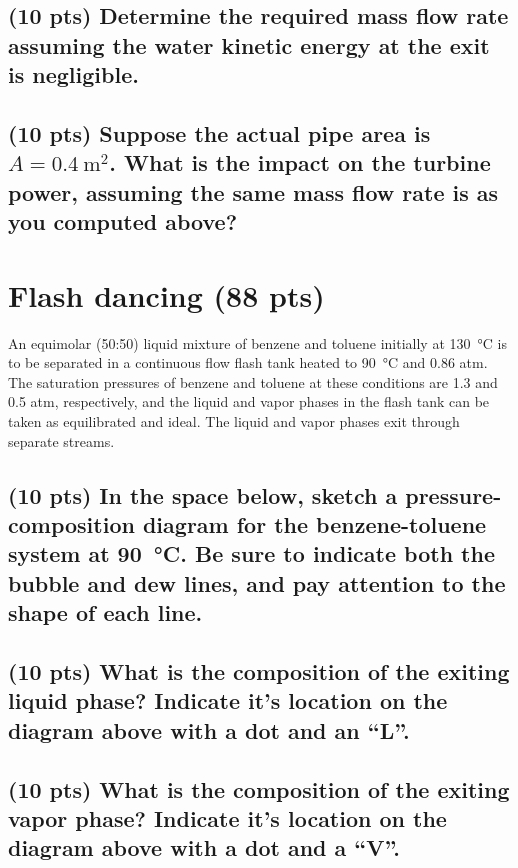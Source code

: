 \documentclass[11pt]{article}
\begin{document}
\subsection{(10 pts) Determine the required mass flow rate assuming the water kinetic energy at the exit is negligible.}
\label{sec-3-2}
\vspace{5cm}

\subsection{(10 pts) Suppose the actual pipe area is \(A = \SI{0.4}{\meter\squared}\).  What is the impact on the turbine power, assuming the same mass flow rate is as you computed above?}
\label{sec-3-3}

\newpage

\section{Flash dancing (88 pts)}
\label{sec-4}
An equimolar (50:50) liquid mixture of benzene and toluene initially at \SI{130}{\celsius} is to be separated in a continuous flow flash tank heated to \SI{90}{\celsius} and 0.86 atm. The saturation pressures of benzene and toluene at these conditions are 1.3 and 0.5 atm, respectively, and the liquid and vapor phases in the flash tank can be taken as equilibrated and ideal.  The liquid and vapor phases exit through separate streams.

\subsection{(10 pts) In the space below, sketch a pressure-composition diagram for the benzene-toluene system at \SI{90}{\celsius}.  Be sure to indicate both the bubble and dew lines, and pay attention to the shape of each line.}
\label{sec-4-1}
\vspace{9cm}

\subsection{(10 pts) What is the composition of the exiting liquid phase?  Indicate it's location on the diagram above with a dot and an ``L''.}
\label{sec-4-2}
\newpage

\subsection{(10 pts) What is the composition of the exiting vapor phase?  Indicate it's location on the diagram above with a dot and a ``V''.}
\label{sec-4-3}
\vspace{10cm}
\end{document}
